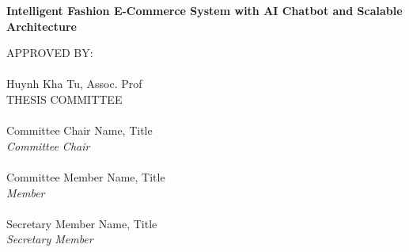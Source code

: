 \begingroup
\centering

\Large
\textbf{Intelligent Fashion E-Commerce System with AI Chatbot and Scalable Architecture}

\vspace{3cm}

\large
APPROVED BY:\\[1.5cm]

\underline{\hspace{5cm}}\\
Huynh Kha Tu, Assoc. Prof\\[1.5cm]

THESIS COMMITTEE\\[1cm]

\underline{\hspace{5cm}}\\
Committee Chair Name, Title\\
\textit{Committee Chair}\\[1cm]

\underline{\hspace{5cm}}\\
Committee Member Name, Title\\
\textit{Member}\\[1cm]

\underline{\hspace{5cm}}\\
Secretary Member Name, Title\\
\textit{Secretary Member}

\par
\endgroup

\pagebreak
